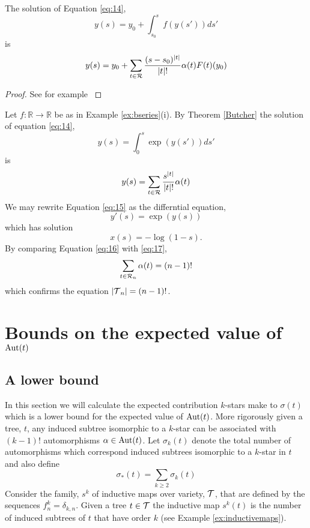 \begin{theorem}\label{Butcher}
 The solution of Equation \ref{eq:14},
 \[
  y(s) = y_0 + \int_{s_0}^{s} f(y(s')) ds'
 \]
is
\[
 y(s) = y_0 + \sum_{t \in \operatorname{\mathcal{R}}} \frac{(s-s_0)^{\lvert t \rvert}}{\lvert t \rvert !}\alpha(t)F(t)(y_0)
\]
\end{theorem}
\begin{proof}
 See for example \cite{Butcher2008,brouder}
\end{proof}
\begin{ex}
 Let $f: \mathbb{R} \rightarrow \mathbb{R}$ be as in Example \ref{ex:bseries}(i).  By Theorem \ref{Butcher} the solution of 
 equation \ref{eq:14},
 \begin{equation}\label{eq:15}
  y(s) = \int_0^s \exp(y(s')) ds'
 \end{equation}
is
\begin{equation}\label{eq:16}
 y(s) = \sum_{t \in \operatorname{\mathcal{R}}}\frac{s^{\lvert t \rvert}}{\lvert t \rvert !}\alpha(t)
\end{equation}
We may rewrite Equation \ref{eq:15} as the differntial equation,
\[
 y'(s) = \exp(y(s))
\]
which has solution 
\begin{equation}\label{eq:17}
 x(s) = -\log(1-s).
\end{equation}
By comparing Equation \ref{eq:16} with \ref{eq:17},
\[
 \sum_{t \in \operatorname{\mathcal{R}}_n} \alpha(t) = (n-1)!
\]
which confirms the equation $\lvert \operatorname{\mathcal{T}}_n \rvert = (n-1)!$.  
\end{ex}



\section{Bounds on the expected value of $\operatorname{Aut}(t)$}\label{sec:bounds}
\subsection{A lower bound}\label{sec:lower}
In this section we will calculate the expected contribution $k$-stars make to $\sigma(t)$ which is a 
lower bound for the expected value of $\operatorname{Aut}(t)$.  More rigorously given a  tree, $t$, any induced subtree isomorphic to a $k$-star 
can be associated with $(k-1)!$ automorphisms $\alpha \in \operatorname{Aut}(t)$. Let $\sigma_k(t)$ denote the total number of automorphisms 
which correspond induced subtrees isomorphic to a $k$-star in $t$ and also define
\[
  \sigma_*(t) = \sum_{k \geq 2} \sigma_{k}(t)
\]
Consider the family, $s^k$ of inductive maps over variety, $\operatorname{\mathcal{T}}$, that are defined by the sequences $f^k_n = \delta_{k,n}$.  
Given a tree $t \in \operatorname{\mathcal{T}}$ the inductive map $s^{k}(t)$ is the number of induced subtrees of $t$ that have order $k$ (see
Example \ref{ex:inductivemaps}). 

